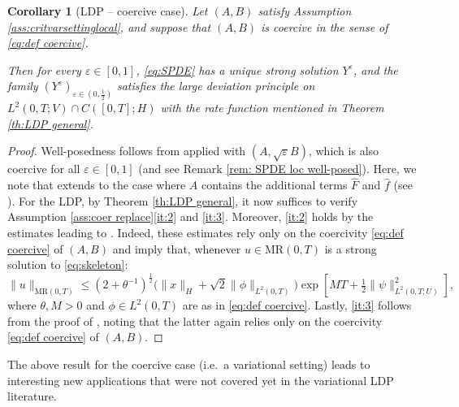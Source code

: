 \documentclass{amsart}
\renewcommand{\MR}{\mathrm{MR}}
\newcommand{\<}{\langle}
\newcommand{\?}{\rangle}
\theoremstyle{plain}
\theoremstyle{remark}
\theoremstyle{plain}
\newtheorem{corollary}[theorem]{Corollary}
\numberwithin{equation}{section}
\newcommand{\eps}{\varepsilon}
\begin{document}
\begin{corollary}[LDP -- coercive case]\label{cor:LDPcoercive}
  Let $(A,B)$ satisfy Assumption \ref{ass:critvarsettinglocal},  and suppose that $(A,B)$ is coercive in the sense of \eqref{eq:def coercive}. 
  
  Then for every $\eps\in[0,1]$, \eqref{eq:SPDE} has a unique strong solution $Y^\eps$, and the family $(Y^\eps)_{\eps\in(0,\frac12)}$ satisfies the large deviation principle on $L^2(0,T;V)\cap C([0,T];H)$ with the rate function mentioned in Theorem \ref{th:LDP general}. 
\end{corollary}
\begin{proof}
Well-posedness follows from  \cite[Th.\ 3.5]{AV22variational} applied with $(A,\sqrt{\eps}B)$, which is also coercive for all $\eps\in[0,1]$ (and see Remark \ref{rem: SPDE loc well-posed}). Here, we note that \cite[Th.\ 3.5]{AV22variational} extends to the case where $A$ contains the additional terms $\hat{F}$ and $\hat{f}$ (see \cite[Th.\ 7.1, Rem.\ 7.2]{BGV}). 
For the LDP, by Theorem \ref{th:LDP general}, it now suffices to verify Assumption \ref{ass:coer replace}\ref{it:2} and \ref{it:3}.  
Moreover, \ref{it:2} holds by the estimates   leading to \cite[(3.31)]{TV24}. Indeed, these estimates rely only on the coercivity \eqref{eq:def coercive} of $(A,B)$ and imply that, whenever $u\in\MR(0,T)$ is a strong solution to \eqref{eq:skeleton}:  
\begin{equation*} 
  \|u\|_{\MR(0,T)}\leq (2+ {\theta}^{-1})^{\frac{1}{2}}\big(\|x\|_H+\sqrt{2}\|\phi\|_{L^2(0,T)} \big)\exp[ MT+\tfrac{1}{2}\|\psi\|_{L^2(0,T;U)}^2],
\end{equation*}
where $\theta, M>0$ and $\phi\in L^2(0,T)$ are as in \eqref{eq:def coercive}.  
Lastly, \ref{it:3} follows from the proof of \cite[Lem.\ 4.11]{TV24}, noting that the latter again relies only on the coercivity \eqref{eq:def coercive} of $(A,B)$. 
\end{proof}



The above result for the coercive case (i.e.\ a variational setting) leads to interesting new applications  that were not covered yet in the  variational LDP literature. 
\end{document}
